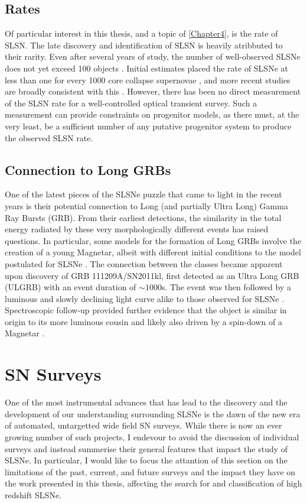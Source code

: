 \subsection{Rates}
Of particular interest in this thesis, and a topic of \cref{Chapter4}, is the rate of SLSN. The late discovery and identification of SLSN is heavily atribbuted to their rarity. Even after several years of study, the number of well-observed SLSNe does not yet exceed 100 objects \citep[e.g., see compilations in][]{Inserra2014,Papadopoulus2015,Nicholl2015,DeCia2018}. Initial estimates placed the rate of SLSNe at less than one for every 1000 core collapse supernovae \citep{Quimby2011}, and more recent studies are broadly consistent with this \citep{Quimby2013,McCrum2015}. However, there has been no direct measurement of the SLSN rate for a well-controlled optical transient survey. Such a measurement can provide constraints on progenitor models, as there must, at the very least, be a sufficient number of any putative progenitor system to produce the observed SLSN rate.

\subsection{Connection to Long GRBs}
One of the latest pieces of the SLSNe puzzle that came to light in the recent years is their potential connection to Long (and partially Ultra Long) Gamma Ray Bursts (GRB). From their earliest detections, the similarity in the total energy radiated by these very morphologically different events has raised questions. In particular, some models for the formation of Long GRBs involve the creation of a young Magnetar, albeit with different initial conditions to the model postulated for SLSNe \citep{Margalit2018}. The connection between the classes became apparent upon discovery of GRB 111209A/SN2011kl, first detected as an Ultra Long GRB (ULGRB) with an event duration of $\sim1000$s. The event was then followed by a luminous and slowly declining light curve alike to those observed for SLSNe \citep{Greiner2015}. Spectroscopic follow-up provided further evidence that the object is similar in origin to its more luminous cousin \citep{Mazzali2015} and likely also driven by a spin-down of a Magnetar \citep{Metzger2015}.

\section{SN Surveys}
One of the most instrumental advances that has lead to the discovery and the development of our understanding surrounding SLSNe is the dawn of the new era of automated, untargetted wide field SN surveys. While there is now an ever growing number of such projects, I endevour to avoid the discussion of individual surveys and instead summerise their general features that impact the study of SLSNe. In particular, I would like to focus the attantion of this section on the limitations of the past, current, and future surveys and the impact they have on the work presented in this thesis, affecting the search for and classification of high redshift SLSNe.

